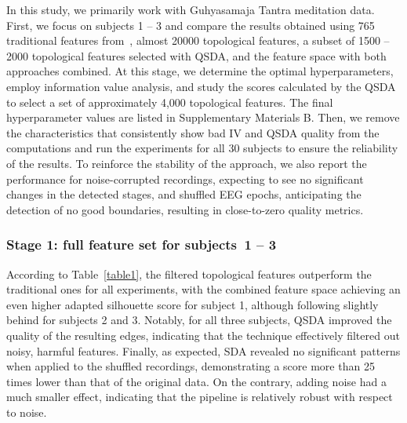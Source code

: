 \documentclass[journal,twoside,web]{ieeecolor2}
\begin{document}
In this study, we primarily work with Guhyasamaja Tantra meditation data. First, we focus on subjects 1 -- 3 and compare the results obtained using 765 traditional features from~\cite{SDA}, almost 20000 topological features, a subset of 1500 -- 2000 topological features selected with QSDA, and the feature space with both approaches combined. At this stage, we determine the optimal hyperparameters, employ information value analysis, and study the scores calculated by the QSDA to select a set of approximately 4,000 topological features. The final hyperparameter values are listed in Supplementary Materials B. Then, we remove the characteristics that consistently show bad IV and QSDA quality from the computations and run the experiments for all 30 subjects to ensure the reliability of the results. To reinforce the stability of the approach, we also report the performance for noise-corrupted recordings, expecting to see no significant changes in the detected stages, and shuffled EEG epochs, anticipating the detection of no good boundaries, resulting in close-to-zero quality metrics.

\subsubsection{Stage 1: full feature set for subjects~1 -- 3}

According to Table~\ref{table1}, the filtered topological features outperform the traditional ones for all experiments, with the combined feature space achieving an even higher adapted silhouette score for subject 1, although following slightly behind for subjects 2 and 3. Notably, for all three subjects, QSDA improved the quality of the resulting edges, indicating that the technique effectively filtered out noisy, harmful features. Finally, as expected, SDA revealed no significant patterns when applied to the shuffled recordings, demonstrating a score more than 25 times lower than that of the original data. On the contrary, adding noise had a much smaller effect, indicating that the pipeline is relatively robust with respect to noise.
\end{document}
